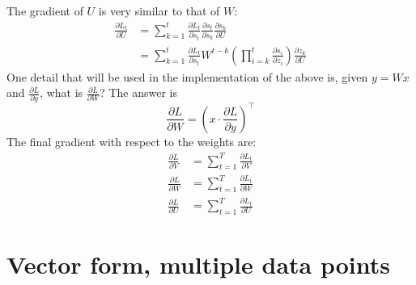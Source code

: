\documentclass{article}
\begin{document}
The gradient of $U$ is very similar to that of $W$:
\begin{align}
    \frac{\partial L_t}{\partial U} &= \sum_{k=1}^t \frac{\partial L_t}{\partial s_t}\frac{\partial s_t}{\partial s_k}\frac{\partial s_k}{\partial U} \\
    &= \sum_{k=1}^t\frac{\partial L_t}{\partial s_t}W^{t-k}\left(\prod_{i=k}^t\frac{\partial s_i}{\partial z_i}\right)\frac{\partial z_k}{\partial U}
\end{align}
One detail that will be used in the implementation of the above is, given $y = Wx$ and $\frac{\partial L}{\partial y}$, what is $\frac{\partial L}{\partial W}$? The answer is
\begin{equation}
   \frac{\partial L}{\partial W} = (x\cdot\frac{\partial L}{\partial y})^\top  
\end{equation}
The final gradient with respect to the weights are:
\begin{align}
    \frac{\partial L}{\partial V} &= \sum_{t=1}^T\frac{\partial L_t}{\partial V} \\
    \frac{\partial L}{\partial W} &= \sum_{t=1}^T\frac{\partial L_t}{\partial W} \\
    \frac{\partial L}{\partial U} &= \sum_{t=1}^T\frac{\partial L_t}{\partial U}
\end{align}

\section{Vector form, multiple data points}
\end{document}
